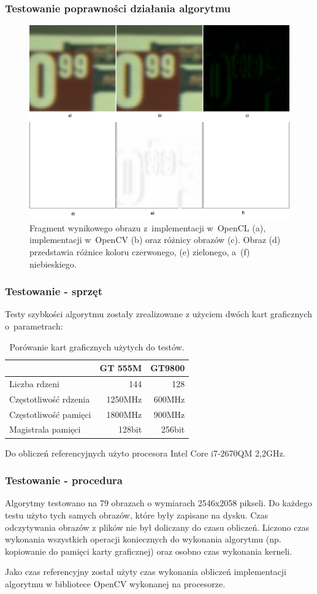 \documentclass{beamer}
\begin{document}
\begin{frame}
  \frametitle{Testowanie poprawności działania algorytmu}
\begin{figure}
  \centering
  \includegraphics[width=0.55\linewidth]{result_diff}
  \caption{Fragment wynikowego obrazu z~implementacji w~OpenCL (a), implementacji w~OpenCV (b) oraz różnicy obrazów (c). Obraz (d) przedstawia różnice koloru czerwonego, (e) zielonego, a~(f) niebieskiego.}
  \label{fig:result_diff}
\end{figure}
\end{frame}

\begin{frame}
  \frametitle{Testowanie - sprzęt}
  Testy szybkości algorytmu zostały zrealizowane z użyciem dwóch kart graficznych o~parametrach:
\begin{center}
\begin{table}
  \caption{Porówanie kart graficznych użytych do testów.}
  \label{tab:gpus}
     \begin{tabular}{ |l | r | r | }
     \hline
       & GT 555M & GT9800 \\ \hline
     Liczba rdzeni & 144 & 128 \\ \hline
     Częstotliwość rdzenia & 1250MHz & 600MHz \\ \hline
     Częstotliwość pamięci & 1800MHz & 900MHz \\ \hline
     Magistrala pamięci & 128bit & 256bit \\ \hline

   \end{tabular}

\end{table}
\end{center}
Do obliczeń referencyjnych użyto procesora Intel Core i7-2670QM 2,2GHz.
\end{frame}

\begin{frame}
  \frametitle{Testowanie - procedura}
  Algorytmy testowano na 79 obrazach o wymiarach 2546x2058 pikseli. Do każdego testu użyto tych samych obrazów, które były zapisane na dysku. Czas odczytywania obrazów z plików nie był doliczany do czasu obliczeń. Liczono czas wykonania wszystkich operacji koniecznych do wykonania algorytmu (np. kopiowanie do pamięci karty graficznej) oraz osobno czas wykonania kerneli.

Jako czas referencyjny został użyty czas wykonania obliczeń implementacji algorytmu w bibliotece OpenCV wykonanej na procesorze.
\end{frame}
\end{document}
